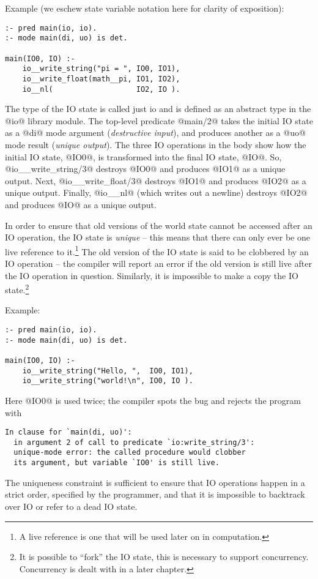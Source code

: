 Example (we eschew state variable notation here for clarity of
exposition):
\begin{verbatim}
:- pred main(io, io).
:- mode main(di, uo) is det.

main(IO0, IO) :-
    io__write_string("pi = ", IO0, IO1),
    io__write_float(math__pi, IO1, IO2),
    io__nl(                   IO2, IO ).
\end{verbatim}
The type of the IO state is called just io and is defined
as an abstract type in the @io@ library module.  The
top-level predicate @main/2@ takes the initial IO state as a
@di@ mode argument (\emph{destructive input}), and produces another as a
@uo@ mode result (\emph{unique output}).  The three IO operations in the body
show how the initial IO state, @IO0@, is transformed into
the final IO state, @IO@.  So, @io__write_string/3@ destroys
@IO0@ and produces @IO1@ as a unique output.  Next,
@io__write_float/3@ destroys @IO1@ and produces @IO2@ as a
unique output.  Finally, @io__nl@ (which writes out a
newline) destroys @IO2@ and produces @IO@ as a unique output.

In order to ensure that old versions of the world state cannot
be accessed after an IO operation, the IO state is \emph{unique} --
this means that there can only ever be one live reference to
it.\footnote{A live reference is one that will be used
later on in computation.}  The old version of the IO state
is said to be clobbered by an IO operation -- the compiler will
report an error if the old version is still live after the IO
operation in question.  Similarly, it is impossible to make a
copy the IO state.\footnote{It is possible to ``fork'' the IO
state, this is necessary to support concurrency.  Concurrency
is dealt with in a later chapter. \XXX{}}

Example:
\begin{verbatim}
:- pred main(io, io).
:- mode main(di, uo) is det.

main(IO0, IO) :-
    io__write_string("Hello, ",  IO0, IO1),
    io__write_string("world!\n", IO0, IO ).
\end{verbatim}
Here @IO0@ is used twice; the compiler spots the bug and
rejects the program with
\begin{verbatim}
In clause for `main(di, uo)':
  in argument 2 of call to predicate `io:write_string/3':
  unique-mode error: the called procedure would clobber
  its argument, but variable `IO0' is still live.
\end{verbatim}
The uniqueness constraint is sufficient to ensure that IO
operations happen in a strict order, specified by the
programmer, and that it is impossible to backtrack over IO or
refer to a dead IO state.

